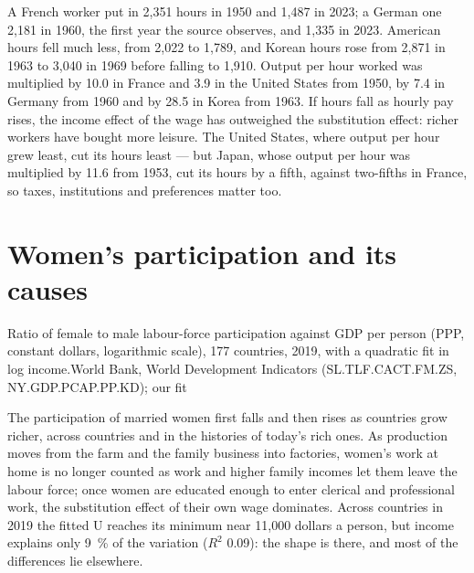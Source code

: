A French worker put in 2{,}351 hours in 1950 and 1{,}487 in 2023; a German one 2{,}181 in 1960,
the first year the source observes, and 1{,}335 in 2023. American hours fell much less,
from 2{,}022 to 1{,}789, and Korean hours rose from 2{,}871 in 1963 to 3{,}040 in 1969 before
falling to 1{,}910. Output per hour worked was multiplied by 10.0 in France and 3.9 in the
United States from 1950, by 7.4 in Germany from 1960 and by 28.5 in Korea from 1963.
If hours fall as hourly pay rises, the income effect of the wage has outweighed the
substitution effect: richer workers have bought more leisure. The United States, where
output per hour grew least, cut its hours least --- but Japan, whose output per hour was
multiplied by 11.6 from 1953, cut its hours by a fifth, against two-fifths in France, so
taxes, institutions and preferences matter too.

\section{Women's participation and its causes}\label{sec:b3:labour-supply-and-demand:women}

\begin{omchart}{Ratio of female to male labour-force participation against GDP per
person (PPP, constant dollars, logarithmic scale), 177 countries, 2019, with a
quadratic fit in log income.}{World Bank, World Development Indicators
(SL.TLF.CACT.FM.ZS, NY.GDP.PCAP.PP.KD); our fit}
\end{omchart}

The participation of married women first falls and then rises as countries grow
richer, across countries and in the histories of today's rich ones. As production
moves from the farm and the family business into factories, women's work at home
is no longer counted as work and higher family incomes let them leave the labour
force; once women are educated enough to enter clerical and professional work,
the substitution effect of their own wage dominates. Across countries in 2019 the
fitted U reaches its minimum near 11{,}000 dollars a person, but income explains only
9~\% of the variation ($R^2$ 0.09): the shape is there, and most of the differences
lie elsewhere.

